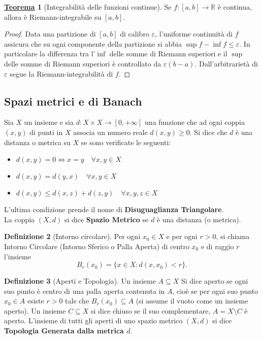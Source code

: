 \documentclass[a4paper,twoside]{article}
\renewcommand{\epsilon}{\varepsilon}
\newcommand{\R}{\mathbb{R}}
\theoremstyle{definition}
\newtheorem{theorem}{\color{Red}\underline{\textrm Teorema}}
\newtheorem{definizione}[theorem]{Definizione}
\numberwithin{theorem}{section}
\begin{document}
\begin{theorem}[Integrabilità delle funzioni continue]
Se $f:[a,b]\to\R$ è continua, allora è Riemann-integrabile su $[a,b]$.
\end{theorem}
\begin{proof}
Data una partizione di $[a,b]$ di calibro $\epsilon$, l'uniforme continuità di $f$ assicura che su ogni componente della partizione si abbia $\sup f-\inf f \leq \epsilon$. In particolare la differenza tra l'$\inf$ delle somme di Riemann superiori e il $\sup$ delle somme di Riemann superiori è controllato da $\epsilon(b-a)$. Dall'arbitrarietà di $\epsilon$ segue la Riemann-integrabilità di $f$. 
\end{proof}


\subsection{Spazi metrici e di Banach}
Sia $X$ un insieme e sia $d:X \times X\to [0,+\infty]$ una funzione che ad ogni coppia $(x,y)$ di punti in $X$ associa un numero reale $d(x,y)\geq0$. Si dice che $d$ è una distanza o metrica su $X$ se sono verificate le seguenti:
\begin{itemize}
\item  $d(x,y)=0 \Leftrightarrow x=y\quad\forall x,y\in X$
\item $d(x,y)=d(y,x)\quad\forall x,y\in X$
\item $d(x,y)\leq d(x,z)+d(z,y)\quad\forall x,y,z\in X$
\end{itemize}
L'ultima condizione prende il nome di \textbf{Disuguaglianza Triangolare}.\\
La coppia $(X,d)$ si dice \textbf{Spazio Metrico} se $d$ è una distanza (o metrica).

\begin{definizione}[Intorno circolare]
Per ogni $x_0\in X$ e per ogni $r>0$, si chiama Intorno Circolare (Intorno Sferico o Palla Aperta) di centro $x_0$ e di raggio $r$ l'insieme $$B_r(x_0)=\{x\in X: d(x,x_0)<r\}.$$
\end{definizione}

\begin{definizione}[Aperti e Topologia]
Un insieme $A\subseteq X$ Si dice aperto se ogni suo punto è centro di una palla aperta contenuta in $A$, cioè se per ogni suo punto $x_0\in A$ esiste $r>0$ tale che $B_r(x_0)\subseteq A$ (si assume il vuoto come un insieme aperto). Un insieme $C\subseteq X$ si dice chiuso se il suo complementare, $A=X\setminus C$ è aperto. L'insieme di tutti gli aperti di uno spazio metrico $(X,d)$ si dice \textbf{Topologia Generata dalla metrica $d$}.
\end{definizione}
\end{document}
